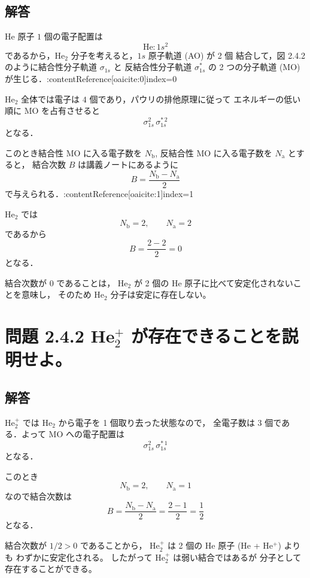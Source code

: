 \documentclass[a4paper,12pt]{jlreq}
\begin{document}
\subsection*{解答}

He 原子 $1$ 個の電子配置は
\[
\mathrm{He}: 1s^2
\]
であるから，He$_2$ 分子を考えると，$1s$ 原子軌道 (AO) が 2 個
結合して，図 2.4.2 のように結合性分子軌道 $\sigma_{1s}$ と
反結合性分子軌道 $\sigma_{1s}^*$ の 2 つの分子軌道 (MO) が生じる．:contentReference[oaicite:0]{index=0}

He$_2$ 全体では電子は $4$ 個であり，パウリの排他原理に従って
エネルギーの低い順に MO を占有させると
\[
\sigma_{1s}^2\,\sigma_{1s}^{*\,2}
\]
となる．

このとき結合性 MO に入る電子数を $N_\mathrm{b}$,
反結合性 MO に入る電子数を $N_\mathrm{a}$ とすると，
結合次数 $B$ は講義ノートにあるように
\[
B=\frac{N_\mathrm{b}-N_\mathrm{a}}{2}
\]
で与えられる．:contentReference[oaicite:1]{index=1}

He$_2$ では
\[
N_\mathrm{b}=2,\qquad N_\mathrm{a}=2
\]
であるから
\[
B=\frac{2-2}{2}=0
\]
となる．

結合次数が $0$ であることは，
He$_2$ が 2 個の He 原子に比べて安定化されないことを意味し，
そのため He$_2$ 分子は安定に存在しない。



\section*{問題 2.4.2 He$_2^+$ が存在できることを説明せよ。}

\subsection*{解答}

He$_2^+$ では He$_2$ から電子を 1 個取り去った状態なので，
全電子数は $3$ 個である．よって MO への電子配置は
\[
\sigma_{1s}^2\,\sigma_{1s}^{*\,1}
\]
となる．

このとき
\[
N_\mathrm{b}=2,\qquad N_\mathrm{a}=1
\]
なので結合次数は
\[
B=\frac{N_\mathrm{b}-N_\mathrm{a}}{2}
 =\frac{2-1}{2}=\frac{1}{2}
\]
となる．

結合次数が $1/2>0$ であることから，
He$_2^+$ は 2 個の He 原子 (He + He$^+$) よりも
わずかに安定化される。
したがって He$_2^+$ は弱い結合ではあるが
分子として存在することができる。



\end{document}
